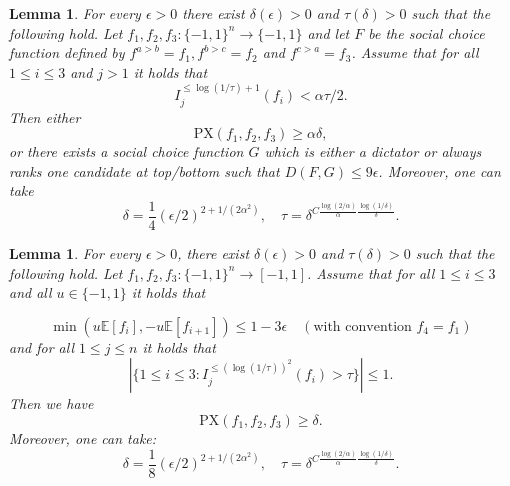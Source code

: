 \documentclass[11pt]{amsart}
\newcommand{\E}{\mathbb{E}}
\newcommand{\eps}{\epsilon}
\newcommand{\1}{\mathbf{1}}
\newcommand{\Px}{\mathrm{PX}}
\def\E{{\mathbb E}}
\theoremstyle{definition}
\theoremstyle{plain}
\newtheorem{lemma}[example]{Lemma}
\theoremstyle{remark}
\numberwithin{equation}{section}
\begin{document}
\begin{lemma} \label{thm:arrow_one_inf}
For every $\eps > 0$ there exist $\delta(\eps) > 0$ and  $\tau(\delta) > 0$ such that the following hold.
Let $f_1,f_2,f_3 : \{-1,1\}^n \to \{-1,1\}$ and let $F$ be the social choice function defined by 
$f^{a>b} = f_1, f^{b>c} = f_2$ and $f^{c>a} = f_3$.
Assume that for all $1 \leq i \leq 3$ and $j > 1$ it holds that
\begin{equation} \label{eq:inf5}
I^{\le\log(1/\tau)+1}_j(f_i) < \alpha \tau/2.
\end{equation}
Then either
\begin{equation} \label{eq:paradox5}
\Px(f_1,f_2,f_3) \geq \alpha \delta,
\end{equation}
or there exists a social choice function $G$ which is either a dictator or always ranks one candidate at top/bottom such that $D(F,G) \leq 9 \eps$.
Moreover, one can take
\[
\delta = \frac{1}{4}(\eps/2)^{2+1/(2 \alpha^2)}, \quad \tau = \delta^{C \frac{\log (2/\alpha)}{\alpha} \frac{\log(1/\delta)}{  \delta }}.
\]
\end{lemma}

\begin{lemma} \label{thm:arrow_low_cross}
For every $\eps > 0$, there exist  $\delta(\epsilon) > 0$ and  $\tau(\delta) > 0$
such that the following hold.
Let $f_1,f_2,f_3 : \{-1,1\}^n \to [-1,1]$.
Assume that for all $1 \leq i \leq 3$ and all $u \in \{-1,1\}$ it holds that

\begin{equation} \label{eq:non_top_bot_cross}
\min(u \E[f_i], -u \E[f_{i+1}]) \leq 1-3\eps \quad (\text{with convention } f_4= f_1)
\end{equation}
and for all $1 \le j \le n$ it holds that
\begin{equation} \label{eq:cross_inf}
|\{ 1 \leq i \leq 3 : I_j^{\le (\log(1/\tau))^2}(f_i) > \tau \}| \leq 1.
\end{equation}
Then we have
\[
\Px(f_1,f_2,f_3) \geq \delta.
\]
Moreover,  one can take:
\[
\delta = \frac{1}{8}(\eps/2)^{2+1/(2 \alpha^2)}, \quad \tau = \delta^{C \frac{\log (2/\alpha)}{\alpha} \frac{\log(1/\delta)}{  \delta }}.
\]
\end{lemma}
\end{document}
